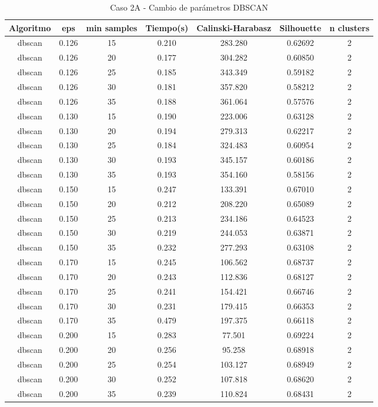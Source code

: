 \begin{table}[H]
\centering
\caption{Caso 2A - Cambio de parámetros DBSCAN}
\label{tab:c2A_dbscan}
\begin{tabular}{ccccccc}
\toprule
Algoritmo & eps & min samples & Tiempo(s) & Calinski-Harabasz & Silhouette & n clusters \\
\midrule
dbscan & 0.126 & 15 & 0.210 & 283.280 & 0.62692 & 2 \\
dbscan & 0.126 & 20 & 0.177 & 304.282 & 0.60850 & 2 \\
dbscan & 0.126 & 25 & 0.185 & 343.349 & 0.59182 & 2 \\
dbscan & 0.126 & 30 & 0.181 & 357.820 & 0.58212 & 2 \\
dbscan & 0.126 & 35 & 0.188 & 361.064 & 0.57576 & 2 \\
dbscan & 0.130 & 15 & 0.190 & 223.006 & 0.63128 & 2 \\
dbscan & 0.130 & 20 & 0.194 & 279.313 & 0.62217 & 2 \\
dbscan & 0.130 & 25 & 0.184 & 324.483 & 0.60954 & 2 \\
dbscan & 0.130 & 30 & 0.193 & 345.157 & 0.60186 & 2 \\
dbscan & 0.130 & 35 & 0.193 & 354.160 & 0.58156 & 2 \\
dbscan & 0.150 & 15 & 0.247 & 133.391 & 0.67010 & 2 \\
dbscan & 0.150 & 20 & 0.212 & 208.220 & 0.65089 & 2 \\
dbscan & 0.150 & 25 & 0.213 & 234.186 & 0.64523 & 2 \\
dbscan & 0.150 & 30 & 0.219 & 244.053 & 0.63871 & 2 \\
dbscan & 0.150 & 35 & 0.232 & 277.293 & 0.63108 & 2 \\
dbscan & 0.170 & 15 & 0.245 & 106.562 & 0.68737 & 2 \\
dbscan & 0.170 & 20 & 0.243 & 112.836 & 0.68127 & 2 \\
dbscan & 0.170 & 25 & 0.241 & 154.421 & 0.66746 & 2 \\
dbscan & 0.170 & 30 & 0.231 & 179.415 & 0.66353 & 2 \\
dbscan & 0.170 & 35 & 0.479 & 197.375 & 0.66118 & 2 \\
dbscan & 0.200 & 15 & 0.283 & 77.501 & 0.69224 & 2 \\
dbscan & 0.200 & 20 & 0.256 & 95.258 & 0.68918 & 2 \\
dbscan & 0.200 & 25 & 0.254 & 103.127 & 0.68949 & 2 \\
dbscan & 0.200 & 30 & 0.252 & 107.818 & 0.68620 & 2 \\
dbscan & 0.200 & 35 & 0.239 & 110.824 & 0.68431 & 2 \\
\bottomrule
\end{tabular}
\end{table}

